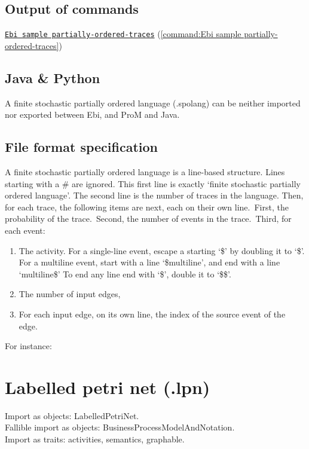 {\subsection*{Output of commands} \null\qquad\hyperref[command:Ebi sample partially-ordered-traces]{\texttt{Ebi sample partially-ordered-traces}} (\cref{command:Ebi sample partially-ordered-traces})
\subsection*{Java \& Python}
A finite stochastic partially ordered language (.spolang) can be neither imported nor exported between Ebi, and ProM and Java.
\subsection*{File format specification}A finite stochastic partially ordered language is a line-based structure. Lines starting with a \# are ignored.
    This first line is exactly `finite stochastic partially ordered language'.
    The second line is the number of traces in the language.
    Then, for each trace, the following items are next, each on their own line.\
    First, the probability of the trace.\
    Second, the number of events in the trace.\
    Third, for each event:
    \begin{enumerate}
    \item The activity.
    For a single-line event, escape a starting `\$' by doubling it to `\$'.
    For a multiline event, start with a line `\$multiline', and end with a line `multiline\$'
    To end any line end with `\$', double it to `\$\$'.
    \item The number of input edges,
    \item For each input edge, on its own line, the index of the source event of the edge.
    \end{enumerate}
    
    For instance:
    
\clearpage
\section{Labelled petri net (.lpn)}
\label{filehandler:labelled Petri net}
Import as objects: LabelledPetriNet.
\\Fallible import as objects: BusinessProcessModelAndNotation.
\\Import as traits: activities, semantics, graphable.
}
